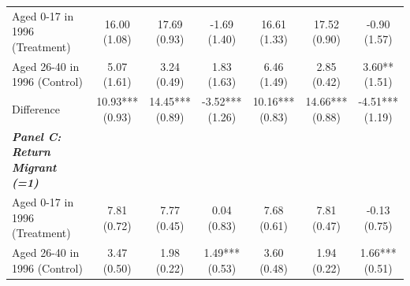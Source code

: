 \begin{landscape}
\begin{table}[!h]
{\begin{threeparttable}
\begin{tabular}[t]{lcccccc}
\addlinespace
Aged 0-17 in 1996 (Treatment) & \makecell[c]{16.00 \\ (1.08)} & \makecell[c]{17.69 \\ (0.93)} & \makecell[c]{-1.69 \\ (1.40)} & \makecell[c]{16.61 \\ (1.33)} & \makecell[c]{17.52 \\ (0.90)} & \makecell[c]{-0.90 \\ (1.57)}\\
Aged 26-40 in 1996 (Control) & \makecell[c]{5.07 \\ (1.61)} & \makecell[c]{3.24 \\ (0.49)} & \makecell[c]{1.83 \\ (1.63)} & \makecell[c]{6.46 \\ (1.49)} & \makecell[c]{2.85 \\ (0.42)} & \makecell[c]{3.60** \\ (1.51)}\\
Difference & \makecell[c]{10.93*** \\ (0.93)} & \makecell[c]{14.45*** \\ (0.89)} & \makecell[c]{-3.52*** \\ (1.26)} & \makecell[c]{10.16*** \\ (0.83)} & \makecell[c]{14.66*** \\ (0.88)} & \makecell[c]{-4.51*** \\ (1.19)}\\
\em{\textbf{Panel C: Return Migrant (=1)}} & \em{\textbf{}} & \em{\textbf{}} & \em{\textbf{}} & \em{\textbf{}} & \em{\textbf{}} & \em{\textbf{}}\\
Aged 0-17 in 1996 (Treatment) & \makecell[c]{7.81 \\ (0.72)} & \makecell[c]{7.77 \\ (0.45)} & \makecell[c]{0.04 \\ (0.83)} & \makecell[c]{7.68 \\ (0.61)} & \makecell[c]{7.81 \\ (0.47)} & \makecell[c]{-0.13 \\ (0.75)}\\
\addlinespace
Aged 26-40 in 1996 (Control) & \makecell[c]{3.47 \\ (0.50)} & \makecell[c]{1.98 \\ (0.22)} & \makecell[c]{1.49*** \\ (0.53)} & \makecell[c]{3.60 \\ (0.48)} & \makecell[c]{1.94 \\ (0.22)} & \makecell[c]{1.66*** \\ (0.51)}\\

\end{tabular}
\end{threeparttable}}
\end{table}
\end{landscape}
